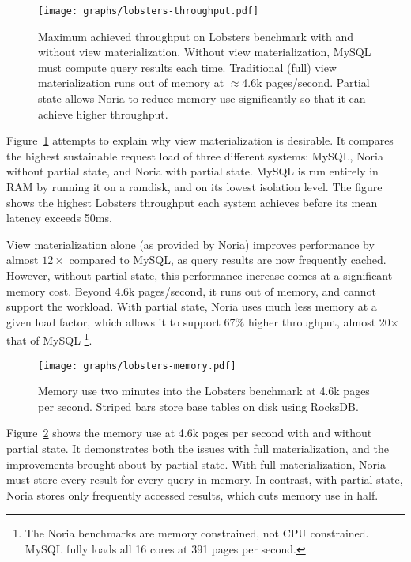 \begin{figure}[h]
  \centering
  \texttt{[image: graphs/lobsters-throughput.pdf]}
  \caption{Maximum achieved throughput on Lobsters benchmark with and without
  view materialization. Without view materialization, MySQL must compute query
  results each time. Traditional (full) view materialization runs out of memory
  at $\approx$4.6k pages/second. Partial state allows Noria to reduce memory use
  significantly so that it can achieve higher throughput.}
  \label{f:lobsters-throughput}
\end{figure}

Figure~\ref{f:lobsters-throughput} attempts to explain why view materialization
is desirable. It compares the highest sustainable request load of three
different systems: MySQL, Noria without partial state, and Noria with partial
state. MySQL is run entirely in RAM by running it on a ramdisk, and on its
lowest isolation level. The figure shows the highest Lobsters throughput each
system achieves before its mean latency exceeds 50ms.

View materialization alone (as provided by Noria) improves performance by almost
$12\times$ compared to MySQL, as query results are now frequently cached.
However, without partial state, this performance increase comes at a significant
memory cost. Beyond 4.6k pages/second, it runs out of memory, and cannot
support the workload. With partial state, Noria uses much less memory at a given
load factor, which allows it to support 67\% higher throughput, almost
20$\times$ that of MySQL%
\footnote{The Noria benchmarks are memory constrained, not CPU constrained.
MySQL fully loads all 16 cores at 391 pages per second.}.

\begin{figure}[h]
  \centering
  \texttt{[image: graphs/lobsters-memory.pdf]}
  \caption{Memory use two minutes into the Lobsters benchmark at 4.6k pages per
  second. Striped bars store base tables on disk using RocksDB.}
  \label{f:lobsters-memory}
\end{figure}

Figure~\ref{f:lobsters-memory} shows the memory use at 4.6k pages per second
with and without partial state. It demonstrates both the issues with full
materialization, and the improvements brought about by partial state. With full
materialization, Noria must store every result for every query in memory. In
contrast, with partial state, Noria stores only frequently accessed results,
which cuts memory use in half.

